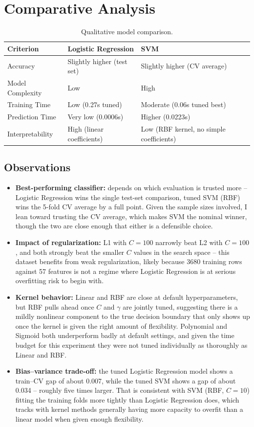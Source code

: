 \documentclass[11pt,a4paper]{article}
\begin{document}
\section{Comparative Analysis}
\begin{table}[h]
\centering
\begin{tabular}{@{}lll@{}}
\toprule
Criterion & Logistic Regression & SVM \\
\midrule
Accuracy & Slightly higher (test set) & Slightly higher (CV average) \\
Model Complexity & Low & High \\
Training Time & Low (0.27s tuned) & Moderate (0.06s tuned best) \\
Prediction Time & Very low (0.0006s) & Higher (0.0223s) \\
Interpretability & High (linear coefficients) & Low (RBF kernel, no simple coefficients) \\
\bottomrule
\end{tabular}
\caption{Qualitative model comparison.}
\end{table}

\subsection{Observations}
\begin{itemize}[nosep]
  \item \textbf{Best-performing classifier:} depends on which evaluation is trusted more -- Logistic Regression wins the single test-set comparison, tuned SVM (RBF) wins the 5-fold CV average by a full point. Given the sample sizes involved, I lean toward trusting the CV average, which makes SVM the nominal winner, though the two are close enough that either is a defensible choice.
  \item \textbf{Impact of regularization:} L1 with $C{=}100$ narrowly beat L2 with $C{=}100$, and both strongly beat the smaller $C$ values in the search space -- this dataset benefits from weak regularization, likely because 3680 training rows against 57 features is not a regime where Logistic Regression is at serious overfitting risk to begin with.
  \item \textbf{Kernel behavior:} Linear and RBF are close at default hyperparameters, but RBF pulls ahead once $C$ and $\gamma$ are jointly tuned, suggesting there is a mildly nonlinear component to the true decision boundary that only shows up once the kernel is given the right amount of flexibility. Polynomial and Sigmoid both underperform badly at default settings, and given the time budget for this experiment they were not tuned individually as thoroughly as Linear and RBF.
  \item \textbf{Bias--variance trade-off:} the tuned Logistic Regression model shows a train--CV gap of about 0.007, while the tuned SVM shows a gap of about 0.034 -- roughly five times larger. That is consistent with SVM (RBF, $C{=}10$) fitting the training folds more tightly than Logistic Regression does, which tracks with kernel methods generally having more capacity to overfit than a linear model when given enough flexibility.
\end{itemize}
\end{document}
